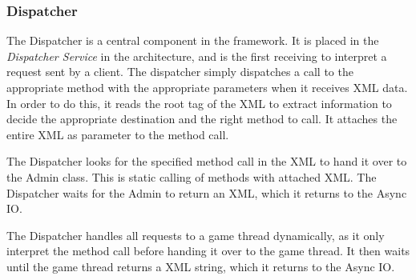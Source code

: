\subsubsection{Dispatcher}\label{subsec:dispatcherdesign}
The Dispatcher is a central component in the framework. It is placed in the \textit{Dispatcher Service} in the architecture, and is the first receiving to interpret a request sent by a client. The dispatcher simply dispatches a call to the appropriate method with the appropriate parameters when it receives XML data. In order to do this, it reads the root tag of the XML to extract information to decide the appropriate destination and the right method to call. It attaches the entire XML as parameter to the method call.

The Dispatcher looks for the specified method call in the XML to hand it over to the Admin class. This is static calling of methods with attached XML. The Dispatcher waits for the Admin to return an XML, which it returns to the Async IO.

The Dispatcher handles all requests to a game thread dynamically, as it only interpret the method call before handing it over to the game thread. It then waits until the game thread returns a XML string, which it returns to the Async IO.